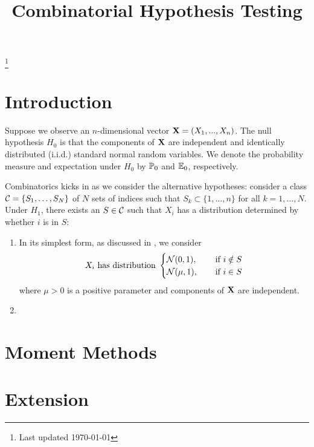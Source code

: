 \documentclass[10pt, oneside]{article}
\begin{document}
\thispagestyle{empty}
\title{Combinatorial Hypothesis Testing}



\maketitle
\tableofcontents
\let\thefootnote\relax\footnote{Last updated \today}
\addtocounter{footnote}{-1}\let\thefootnote\svthefootnote

\section{Introduction}

Suppose we observe an $n$-dimensional vector $\mathbf{X} = (X_1,...,X_n)$. The null hypothesis $H_0$ is that the components of $\mathbf{X}$ are independent and identically distributed (i.i.d.) standard normal random variables. We denote the probability measure and expectation under $H_0$ by $\mathbb{P}_0$ and $\mathbb{E}_0$, respectively.

Combinatorics kicks in as we consider the alternative hypotheses: consider a class ${\mathcal C}=\{S_1,\ldots,S_N\}$ of $N$ sets of indices such that $S_k \subset\{1,\ldots,n\}$ for all $k=1,\ldots,N$. Under $H_1$, there
exists an $S \in {\mathcal C}$ such that $X_i$ has a distribution determined by whether $i$ is in $S$:
\begin{enumerate}
  \item In its simplest form, as discussed in \cite{arias2008searching, addario2010combinatorial, arias2011detection}, we consider 
$$
X_i \mbox{ has distribution }
\begin{cases}
  {\mathcal N}(0,1), \quad & \mbox{ if }i \notin S\\
  {\mathcal N}(\mu,1), & \mbox{ if }i \in S
\end{cases}
$$
where $\mu>0$ is a positive parameter and components of $\mathbf{X}$ are independent. 
  \item 
\end{enumerate}

\section{Moment Methods}

\section{Extension}



\end{document}
